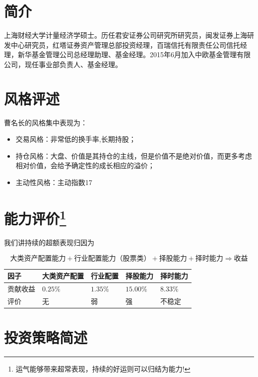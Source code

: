 \documentclass[journal=jacsat,manuscript=article]{achemso}
\begin{document}
\section{简介}

上海财经大学计量经济学硕士。历任君安证券公司研究所研究员，闽发证券上海研发中心研究员，红塔证券资产管理总部投资经理，百瑞信托有限责任公司信托经理，新华基金管理公司总经理助理、基金经理。2015年6月加入中欧基金管理有限公司，现任事业部负责人、基金经理。

\section{风格评述}

曹名长的风格集中表现为：

\begin{itemize}
\item 交易风格：非常低的换手率,长期持股；
\item 持仓风格：大盘、价值是其持仓的主线，但是价值不是绝对价值，而更多考虑相对价值，会给予确定性的成长相应的溢价；
\item 主动性风格：主动指数17%
\end{itemize}

\section{\texorpdfstring{能力评价\footnote{运气能够带来超常表现，持续的好运则可以归结为能力!}}{能力评价}}

我们讲持续的超额表现归因为

\begin{equation}
\mbox{大类资产配置能力} + \mbox{行业配置能力（股票类）}+ \mbox{择股能力} + \mbox{择时能力} \Rightarrow \mbox{收益}
\end{equation}

\begin{table}
  \begin{tabular}{l|llll}
    因子 &大类资产配置  & 行业配置  & 择股能力 & 择时能力  \\ \hline
    贡献收益 & $0.25\%$   & $1.35\%$ & $15.00\%$ &  $8.33\%$  \\
    评价 & 无 & 弱 & 强 & 不稳定  \\ \hline
  \end{tabular}
\end{table}

\section{投资策略简述}
\end{document}
